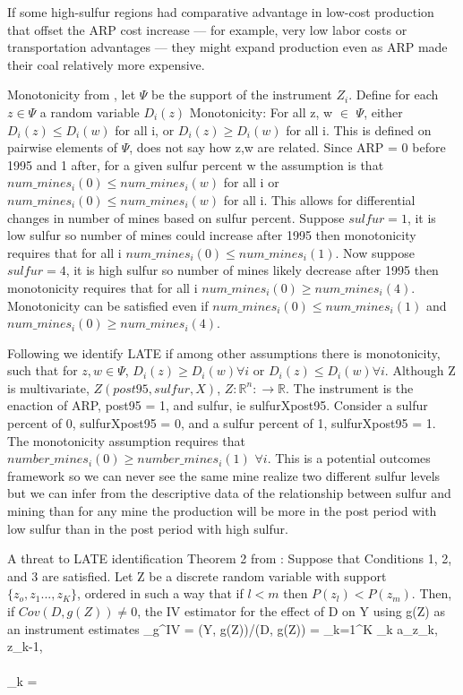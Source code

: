 \documentclass{article}
\begin{document}
If some high-sulfur regions had comparative advantage in low-cost production that offset the ARP cost increase — for example, very low labor costs or transportation advantages — they might expand production even as ARP made their coal relatively more expensive.

Monotonicity from \cite{angrist1994identification}, let $\Psi$ be the support of the instrument $Z_i$. Define for each $z \in \Psi$ a random variable $D_i(z)$
Monotonicity: For all z, w $\in$ $\Psi$, either $D_i(z) \leq D_i(w)$ for all i, or $D_i(z) \geq D_i(w)$ for all i. This is defined on pairwise elements of $\Psi$, does not say how z,w are related.
Since ARP = 0 before 1995 and 1 after, for a given sulfur percent w the assumption is that $num\_mines_i(0) \leq num\_mines_i(w)$ for all i or $num\_mines_i(0) \leq num\_mines_i(w)$ for all i. This allows for differential changes in number of mines based on sulfur percent. Suppose $sulfur= 1$, it is low sulfur so number of mines could increase after 1995 then monotonicity requires that for all i $num\_mines_i(0) \leq num\_mines_i(1)$. Now suppose $sulfur = 4$, it is high sulfur so number of mines likely decrease after 1995 then monotonicity requires that for all i $num\_mines_i(0) \geq num\_mines_i(4)$. Monotonicity can be satisfied even if $num\_mines_i(0) \leq num\_mines_i(1)$ and $num\_mines_i(0) \geq num\_mines_i(4)$.

Following \cite{angrist1995identification} we identify LATE if among other assumptions there is monotonicity, such that for $ z,w\in \Psi$, $D_i(z)\geq D_i(w) \forall i$ or $D_i(z)\leq D_i(w) \forall i$. Although Z is multivariate, $Z(post95,sulfur, X)$, $Z:\mathbb{R}^n:\rightarrow\mathbb{R}$. The instrument is the enaction of ARP, post95 = 1, and sulfur, ie sulfurXpost95. Consider a sulfur percent of 0, sulfurXpost95 = 0, and a sulfur percent of 1, sulfurXpost95 = 1. The monotonicity assumption requires that $number\_mines_i(0) \geq number\_mines_i(1)$ $\forall i$. This is a potential outcomes framework so we can never see the same mine realize two different sulfur levels but we can infer from the descriptive data of the relationship between sulfur and mining than for any mine the production will be more in the post period with low sulfur than in the post period with high sulfur.

A threat to LATE identification Theorem 2 from \cite{angrist1994identification}: Suppose that Conditions 1, 2, and 3 are satisfied. Let Z be a discrete random variable with support $\{z_o, z_1. . .  ,z_K\}$, ordered in such a way that if $l <
m$ then $P(z_l) <P(z_m)$. Then, if $Cov(D, g(Z)) \neq 0$, the IV estimator for the effect of D on Y using g(Z) as an instrument estimates
    \alpha_g^{IV} = (Y, g(Z))/(D, g(Z)) = \sum_{k=1}^{K} \lambda_k \cdot a_{z_k, z_{k-1}}, \\
 \\
\lambda_k = 
\end{document}

